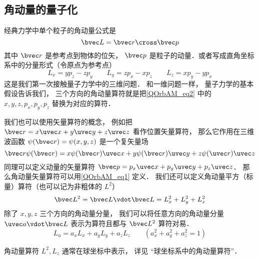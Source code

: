 
\begin{issues}
\issueDraft
\issueMissDepend
\end{issues}


\subsection{角动量的量子化}

经典力学中单个粒子的角动量公式是
\begin{equation}\label{QOrbAM_eq1}
\bvec L = \bvec r \cross \bvec p
\end{equation}
其中 $\bvec r$ 是参考点到物体的位矢， $\bvec p$ 是粒子的动量．或者写成直角坐标系中的分量形式（令原点为参考点）
\begin{equation}\label{QOrbAM_eq2}
L_x = y p_z - z p_y \qquad
L_y = z p_x - x p_z \qquad
L_z = x p_y - y p_x
\end{equation}   
这是我们第一次接触量子力学中的三维问题． 和一维问题一样， 量子力学的基本假设告诉我们， 三个方向的角动量算符就是把\autoref{QOrbAM_eq2} 中的 $x, y, z, p_x, p_y, p_z$ 替换为对应的算符．

我们也可以使用矢量算符的概念， 例如把 $\bvec r = x\uvec x + y\uvec y + z\uvec z$ 看作位置矢量算符， 那么它作用在三维波函数 $\psi(\bvec r) = \psi(x, y, z)$ 是一个复矢量场
\begin{equation}
\bvec r \psi(\bvec r) = x \psi(\bvec r) \uvec x + y \psi(\bvec r) \uvec y + z \psi(\uvec r) \uvec z
\end{equation}
同理可以定义动量的矢量算符 $\bvec p = p_x \uvec x + p_y\uvec y + p_z\uvec z$． 那么角动量矢量算符可以用\autoref{QOrbAM_eq1} 定义． 我们还可以定义角动量平方（标量）算符（也可以记为非粗体的 $L^2$）
\begin{equation}
\bvec L^2 = \bvec L \vdot \bvec L = L_x^2 + L_y^2 + L_z^2
\end{equation}
除了 $x, y, z$ 三个方向的角动量分量， 我们可以将任意方向的角动量分量 $\uvec a \vdot \bvec L$ 表示为算符且都与 $\bvec L^2$ 算符对易．
\begin{equation}
L_a = a_x L_x + a_y L_y + a_z L_z \qquad (a_x^2 + a_y^2 + a_z^2 = 1)
\end{equation}

角动量算符 $L^2, L_z$ 通常在球坐标中表示， 详见 “球坐标系中的角动量算符”．

